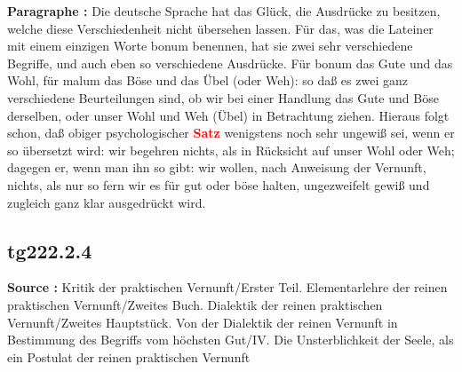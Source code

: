 \documentclass[a4paper,12pt,twoside]{book}
\newcommand{\match}[1]{\textcolor{red}{\textbf{#1}}}
\begin{document}
	\noindent\textbf{Paragraphe : }Die deutsche Sprache hat das Glück, die Ausdrücke zu besitzen, welche diese Verschiedenheit nicht übersehen lassen.  Für das, was die Lateiner mit einem einzigen Worte bonum benennen, hat sie zwei sehr verschiedene Begriffe, und auch eben so verschiedene Ausdrücke. Für bonum das Gute und das Wohl, für malum das Böse und das Übel (oder Weh): so daß es zwei ganz verschiedene Beurteilungen sind, ob wir bei einer Handlung das Gute und Böse derselben, oder unser Wohl und Weh (Übel) in Betrachtung ziehen. Hieraus folgt schon, daß obiger psychologischer \match{Satz} wenigstens noch sehr ungewiß sei, wenn er so übersetzt wird: wir begehren nichts, als in Rücksicht auf unser Wohl oder Weh; dagegen er, wenn man ihn so gibt: wir wollen, nach Anweisung der Vernunft, nichts, als nur so fern wir es für gut oder böse halten, ungezweifelt gewiß und zugleich ganz klar ausgedrückt wird. 
	
	\subsection*{tg222.2.4} 
	\textbf{Source : }Kritik der praktischen Vernunft/Erster Teil. Elementarlehre der reinen praktischen Vernunft/Zweites Buch. Dialektik der reinen praktischen Vernunft/Zweites Hauptstück. Von der Dialektik der reinen Vernunft in Bestimmung des Begriffs vom höchsten Gut/IV. Die Unsterblichkeit der Seele, als ein Postulat der reinen praktischen Vernunft\\  
	
\end{document}
